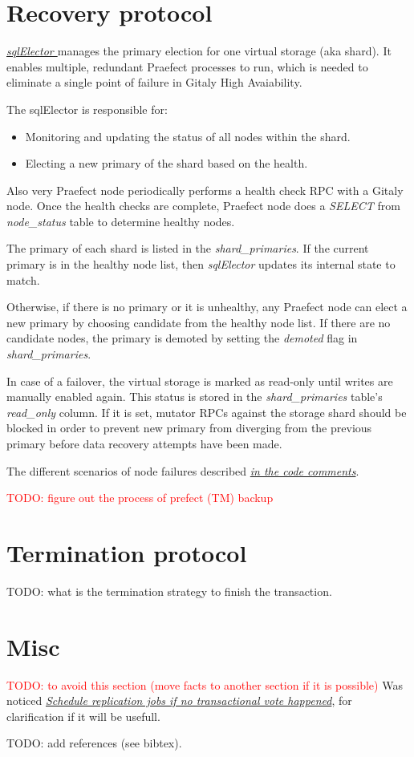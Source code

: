 \documentclass[acmlarge, screen, nonacm]{acmart}
\newcommand{\todo}[1]{\textcolor{red}{TODO: #1}}
\begin{document}
\section{Recovery protocol}


\emph{\href{https://gitlab.com/gitlab-org/gitaly/-/blob/master/internal/praefect/nodes/sql_elector.go}{sqlElector }}manages 
the primary election for one virtual storage (aka shard). It enables multiple, redundant Praefect 
processes to run, which is needed to eliminate a single point of failure in Gitaly High Avaiability.

The sqlElector is responsible for:
\begin{itemize}
\item Monitoring and updating the status of all nodes within the shard.
\item Electing a new primary of the shard based on the health.
\end{itemize}
Also very Praefect node periodically performs a health check RPC with a Gitaly node. 
Once the health checks are complete, Praefect node does a \textit{SELECT} from \textit{node\_status} table to determine healthy nodes.

The primary of each shard is listed in the
\textit{shard\_primaries}. If the current primary is in the healthy
node list, then \textit{sqlElector} updates its internal state to match.

Otherwise, if there is no primary or it is unhealthy, any Praefect node
can elect a new primary by choosing candidate from the healthy node
list. If there are no candidate nodes, the primary is demoted by setting the \textit{demoted} flag in \textit{shard\_primaries}.

In case of a failover, the virtual storage is marked as read-only until writes are manually enabled
again. This status is stored in the \textit{shard\_primaries} table's \textit{read\_only }column. If it is set,
 mutator RPCs against the storage shard should be blocked in order to prevent new primary from
diverging from the previous primary before data recovery attempts have been made.

The different scenarios of node failures described \emph{\href{https://gitlab.com/gitlab-org/gitaly/-/blob/master/internal/praefect/nodes/sql_elector.go\#L401}{in the code comments}}.

\todo{figure out the process of prefect (TM) backup}

\section{Termination protocol}

TODO: what is the termination strategy to finish the transaction.

\section{Misc}
\todo{to avoid this section (move facts to another section if it is possible)}
  Was noticed
  \emph{\href{https://gitlab.com/gitlab-org/gitaly/-/issues/2466}{Schedule replication jobs if no transactional vote happened}},
  for clarification if it will be usefull.

TODO: add references (see bibtex).
\end{document}
